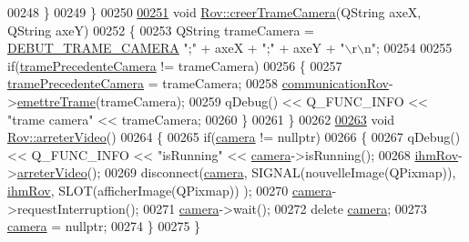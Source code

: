 \begin{DoxyCode}
00248     \}
00249 \}
00250 
\hyperlink{class_rov_a204b1f4efe5a89f4458d84e17858e7c8}{00251} \textcolor{keywordtype}{void} \hyperlink{class_rov_a204b1f4efe5a89f4458d84e17858e7c8}{Rov::creerTrameCamera}(QString axeX, QString axeY)
00252 \{
00253     QString trameCamera = \hyperlink{rov_8h_adc800d68618fc04d8386c438c5a890ca}{DEBUT\_TRAME\_CAMERA} \textcolor{stringliteral}{";"} + axeX + \textcolor{stringliteral}{";"} + axeY + \textcolor{stringliteral}{"\(\backslash\)r\(\backslash\)n"};
00254 
00255     \textcolor{keywordflow}{if}(\hyperlink{class_rov_a66e64595d9bb97dfbfa6f2ed9548b216}{tramePrecedenteCamera} != trameCamera)
00256     \{
00257         \hyperlink{class_rov_a66e64595d9bb97dfbfa6f2ed9548b216}{tramePrecedenteCamera} = trameCamera;
00258         \hyperlink{class_rov_a8e7aaa17ee2134f26d57241d11ab2a99}{communicationRov}->\hyperlink{class_communication_rov_a4f52076db8d6e78abe1745fa1e235272}{emettreTrame}(trameCamera);
00259         qDebug() << Q\_FUNC\_INFO << \textcolor{stringliteral}{"trame camera"} << trameCamera;
00260     \}
00261 \}
00262 
\hyperlink{class_rov_a241368439666a2549faff42931d82dfb}{00263} \textcolor{keywordtype}{void} \hyperlink{class_rov_a241368439666a2549faff42931d82dfb}{Rov::arreterVideo}()
00264 \{
00265     \textcolor{keywordflow}{if}(\hyperlink{class_rov_ad0461ecece812497ee9b4a962f168c18}{camera} != \textcolor{keyword}{nullptr})
00266     \{
00267         qDebug() << Q\_FUNC\_INFO << \textcolor{stringliteral}{"isRunning"} << \hyperlink{class_rov_ad0461ecece812497ee9b4a962f168c18}{camera}->isRunning();
00268         \hyperlink{class_rov_a9b1c1c3b4e268a32e69b2ea4c863b817}{ihmRov}->\hyperlink{class_i_h_m_rov_a81335964f1443d11e0929017b2f21267}{arreterVideo}();
00269         disconnect(\hyperlink{class_rov_ad0461ecece812497ee9b4a962f168c18}{camera}, SIGNAL(nouvelleImage(QPixmap)), \hyperlink{class_rov_a9b1c1c3b4e268a32e69b2ea4c863b817}{ihmRov}, SLOT(afficherImage(QPixmap))
      );
00270         \hyperlink{class_rov_ad0461ecece812497ee9b4a962f168c18}{camera}->requestInterruption();
00271         \hyperlink{class_rov_ad0461ecece812497ee9b4a962f168c18}{camera}->wait();
00272         \textcolor{keyword}{delete} \hyperlink{class_rov_ad0461ecece812497ee9b4a962f168c18}{camera};
00273         \hyperlink{class_rov_ad0461ecece812497ee9b4a962f168c18}{camera} = \textcolor{keyword}{nullptr};
00274     \}
00275 \}
\end{DoxyCode}
